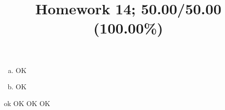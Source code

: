 \documentclass[10pt]{article} %
\title{Homework 14;
50.00/50.00 (100.00\%)
}
\begin{document}
\maketitle
{}
\begin{enumerate}[(a)]
  \item OK
  \item OK
\end{enumerate}
ok
OK
OK
OK
\end{document}
